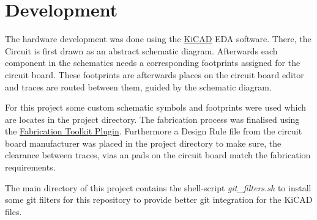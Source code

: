 \section{Development}

The hardware development was done using the \href{https://www.kicad.org/}{KiCAD} EDA software. There, the Circuit is first drawn as an abstract schematic diagram. Afterwards each component in the schematics needs a corresponding footprints assigned for the circuit board. These footprints are afterwards places on the circuit board editor and traces are routed between them, guided by the schematic diagram.

For this project some custom schematic symbols and footprints were used which are locates in the project directory. The fabrication process was finalised using the \href{https://github.com/bennymeg/Fabrication-Toolkit}{Fabrication Toolkit Plugin}. Furthermore a Design Rule file from the circuit board manufacturer was placed in the project directory to make sure, the clearance between traces, vias an pads on the circuit board match the fabrication requirements.

The main directory of this project contains the shell-script \textit{git\_filters.sh} to install some git filters for this repository to provide better git integration for the KiCAD files.
